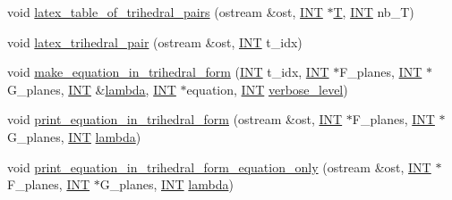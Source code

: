 \begin{DoxyCompactItemize}
\item 
void \mbox{\hyperlink{classsurface__object_ae64b2ea950f99fb467960a0f2cbe7aa7}{latex\+\_\+table\+\_\+of\+\_\+trihedral\+\_\+pairs}} (ostream \&ost, \mbox{\hyperlink{galois_8h_a09fddde158a3a20bd2dcadb609de11dc}{I\+NT}} $\ast$\mbox{\hyperlink{pentomino__5x5_8_c_a2b44a927c3e8a68f69f9f943c32c696d}{T}}, \mbox{\hyperlink{galois_8h_a09fddde158a3a20bd2dcadb609de11dc}{I\+NT}} nb\+\_\+T)
\item 
void \mbox{\hyperlink{classsurface__object_ae5f992f6e9c83b63306dbec1ce0ea7b9}{latex\+\_\+trihedral\+\_\+pair}} (ostream \&ost, \mbox{\hyperlink{galois_8h_a09fddde158a3a20bd2dcadb609de11dc}{I\+NT}} t\+\_\+idx)
\item 
void \mbox{\hyperlink{classsurface__object_a27fe2b23c959d65da1c1cac88a38ca08}{make\+\_\+equation\+\_\+in\+\_\+trihedral\+\_\+form}} (\mbox{\hyperlink{galois_8h_a09fddde158a3a20bd2dcadb609de11dc}{I\+NT}} t\+\_\+idx, \mbox{\hyperlink{galois_8h_a09fddde158a3a20bd2dcadb609de11dc}{I\+NT}} $\ast$F\+\_\+planes, \mbox{\hyperlink{galois_8h_a09fddde158a3a20bd2dcadb609de11dc}{I\+NT}} $\ast$G\+\_\+planes, \mbox{\hyperlink{galois_8h_a09fddde158a3a20bd2dcadb609de11dc}{I\+NT}} \&\mbox{\hyperlink{plane__search_8_c_ae2170c3116b1f345ee7505695206555e}{lambda}}, \mbox{\hyperlink{galois_8h_a09fddde158a3a20bd2dcadb609de11dc}{I\+NT}} $\ast$equation, \mbox{\hyperlink{galois_8h_a09fddde158a3a20bd2dcadb609de11dc}{I\+NT}} \mbox{\hyperlink{simeon_8_c_a818073fbcc2f439e7c56952f67386122}{verbose\+\_\+level}})
\item 
void \mbox{\hyperlink{classsurface__object_ac0255c793ce4ffc32e1cecb06756dc6f}{print\+\_\+equation\+\_\+in\+\_\+trihedral\+\_\+form}} (ostream \&ost, \mbox{\hyperlink{galois_8h_a09fddde158a3a20bd2dcadb609de11dc}{I\+NT}} $\ast$F\+\_\+planes, \mbox{\hyperlink{galois_8h_a09fddde158a3a20bd2dcadb609de11dc}{I\+NT}} $\ast$G\+\_\+planes, \mbox{\hyperlink{galois_8h_a09fddde158a3a20bd2dcadb609de11dc}{I\+NT}} \mbox{\hyperlink{plane__search_8_c_ae2170c3116b1f345ee7505695206555e}{lambda}})
\item 
void \mbox{\hyperlink{classsurface__object_ae570775863861dbf2127f755b9c886bd}{print\+\_\+equation\+\_\+in\+\_\+trihedral\+\_\+form\+\_\+equation\+\_\+only}} (ostream \&ost, \mbox{\hyperlink{galois_8h_a09fddde158a3a20bd2dcadb609de11dc}{I\+NT}} $\ast$F\+\_\+planes, \mbox{\hyperlink{galois_8h_a09fddde158a3a20bd2dcadb609de11dc}{I\+NT}} $\ast$G\+\_\+planes, \mbox{\hyperlink{galois_8h_a09fddde158a3a20bd2dcadb609de11dc}{I\+NT}} \mbox{\hyperlink{plane__search_8_c_ae2170c3116b1f345ee7505695206555e}{lambda}})

\end{DoxyCompactItemize}
